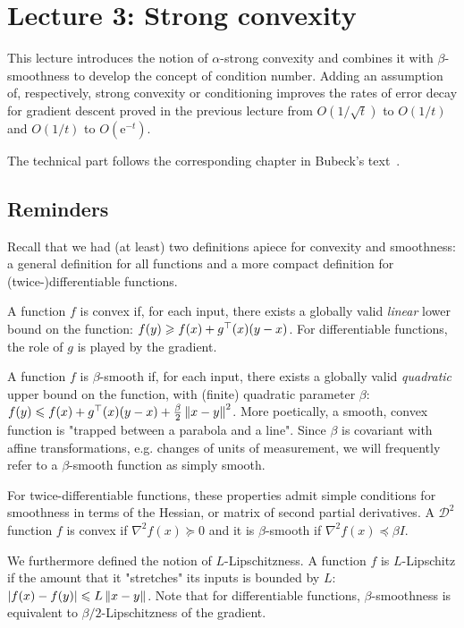 \section{Lecture 3: Strong convexity}

This lecture introduces the notion of
$\alpha$-strong convexity
and combines it with
$\beta$-smoothness to develop the concept of
condition number.
Adding an assumption of, respectively,
strong convexity or conditioning
improves the rates of error decay
for gradient descent proved
in the previous lecture from
$O(1/\sqrt{t})$ to $O(1/t)$ and
$O(1/t)$ to $O(\mathrm{e}^{-t})$.

The technical part follows the corresponding chapter in Bubeck's
text~\cite{Bubeck}.

\subsection{Reminders}

Recall that we had (at least)
two definitions apiece for
convexity and smoothness:
a general definition for all functions
and a more compact definition for (twice-)differentiable functions.

A function $f$ is convex
if, for each input, there exists a
globally valid \emph{linear} lower bound on the function:
$f(y) \geqslant f(x) + g^\top(x)(y-x)$.
For differentiable functions,
the role of $g$ is played by the gradient.

A function $f$ is $\beta$-smooth
if, for each input, there exists a
globally valid \emph{quadratic} upper bound on the function,
with (finite) quadratic parameter $\beta$:
$f(y) \leqslant f(x) + g^\top(x)(y-x) + \frac{\beta}{2}\left\lVert x-y\right\rVert^2$.
More poetically,
a smooth, convex function is
"trapped between a parabola and a line".
Since $\beta$ is covariant with affine transformations,
e.g. changes of units of measurement,
we will frequently refer to a $\beta$-smooth function as simply
smooth.

For twice-differentiable functions,
these properties admit simple conditions
for smoothness in terms of the Hessian,
or matrix of second partial derivatives.
A $\mathcal{D}^2$ function $f$ is convex if
$\nabla^2f(x) \succeq 0$
and it is $\beta$-smooth if
$\nabla^2f(x) \preceq \beta I$.

We furthermore defined the notion of $L$-Lipschitzness.
A function $f$ is $L$-Lipschitz if the amount that it
"stretches" its inputs is bounded by $L$:
$\left\lvert f(x)-f(y)\right\rvert \leqslant L\left\lVert x-y\right\rVert$.
Note that for differentiable functions,
$\beta$-smoothness is equivalent to
$\beta/2$-Lipschitzness of the gradient.

